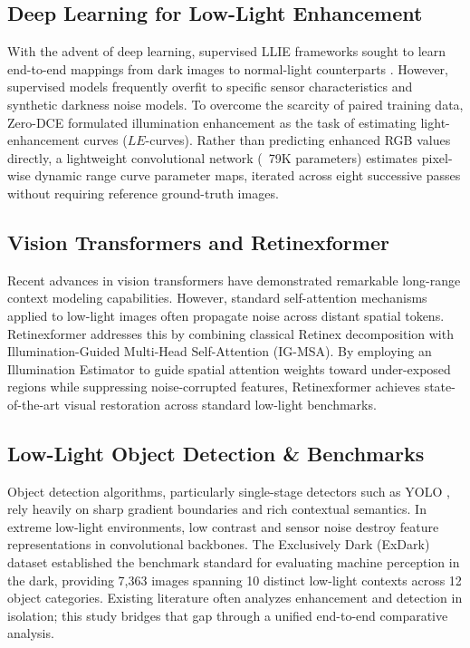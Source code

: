 \documentclass[conference]{IEEEtran}
\begin{document}
\subsection{Deep Learning for Low-Light Enhancement}
With the advent of deep learning, supervised LLIE frameworks sought to learn end-to-end mappings from dark images to normal-light counterparts \cite{zhang2019kindling,xu2020learning}. However, supervised models frequently overfit to specific sensor characteristics and synthetic darkness noise models. To overcome the scarcity of paired training data, Zero-DCE \cite{guo2020zero} formulated illumination enhancement as the task of estimating light-enhancement curves ($LE$-curves). Rather than predicting enhanced RGB values directly, a lightweight convolutional network (~79K parameters) estimates pixel-wise dynamic range curve parameter maps, iterated across eight successive passes without requiring reference ground-truth images.

\subsection{Vision Transformers and Retinexformer}
Recent advances in vision transformers have demonstrated remarkable long-range context modeling capabilities. However, standard self-attention mechanisms applied to low-light images often propagate noise across distant spatial tokens. Retinexformer \cite{cai2023retinexformer} addresses this by combining classical Retinex decomposition with Illumination-Guided Multi-Head Self-Attention (IG-MSA). By employing an Illumination Estimator to guide spatial attention weights toward under-exposed regions while suppressing noise-corrupted features, Retinexformer achieves state-of-the-art visual restoration across standard low-light benchmarks.

\subsection{Low-Light Object Detection & Benchmarks}
Object detection algorithms, particularly single-stage detectors such as YOLO \cite{redmon2016you,jocher2024yolo11}, rely heavily on sharp gradient boundaries and rich contextual semantics. In extreme low-light environments, low contrast and sensor noise destroy feature representations in convolutional backbones. The Exclusively Dark (ExDark) dataset \cite{loh2019getting} established the benchmark standard for evaluating machine perception in the dark, providing 7,363 images spanning 10 distinct low-light contexts across 12 object categories. Existing literature often analyzes enhancement and detection in isolation; this study bridges that gap through a unified end-to-end comparative analysis.
\end{document}
